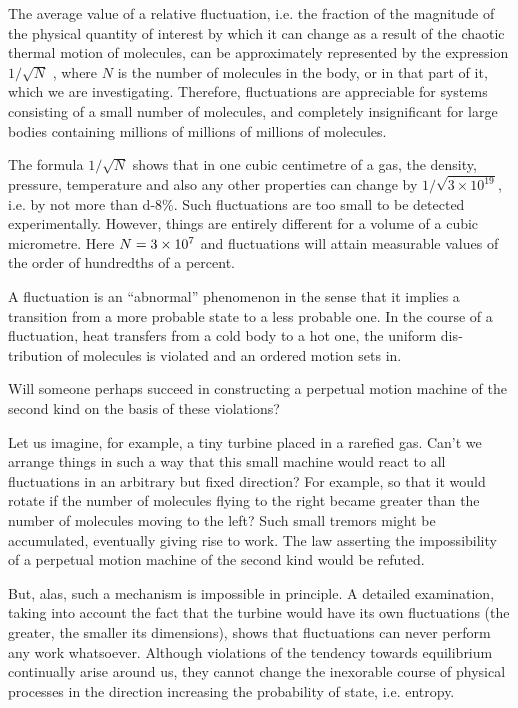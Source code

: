 The average value of a relative fluctuation, i.e. the fraction of the magnitude of the physical quantity of interest by which it can change as a result of the chaotic thermal motion of molecules, can be approximately
represented by the expression $1/\sqrt{N}$ , where $N$ is the number of molecules in the body, or in that part of it, which we are investigating. Therefore, fluctuations are appre­ciable for systems consisting of a small number of mole­cules, and completely insignificant for large bodies containing millions of millions of millions of molecules.

The formula $1/\sqrt{N}$ shows that in one cubic centimetre of a gas, the density, pressure, temperature and also any other properties can change by $1/\sqrt{3 \times 10^{19}}$, i.e. by not more than \num{d-8}\%. Such fluctuations are too small to be detected experimentally. However, things are entirely different for a volume of a cubic micrometre. Here $N = \num{3d7}$ and fluctuations will attain measurable val­ues of the order of hundredths of a percent.

A fluctuation is an ``abnormal'' phenomenon in the sense that it implies a transition from a more probable state to a less probable one. In the course of a fluctuation, heat transfers from a cold body to a hot one, the uniform dis­tribution of molecules is violated and an ordered motion sets in.

Will someone perhaps succeed in constructing a perpet­ual motion machine of the second kind on the basis of these violations?

Let us imagine, for example, a tiny turbine placed in a rarefied gas. Can’t we arrange things in such a way that this small machine would react to all fluctuations in an arbitrary but fixed direction? For example, so that it would rotate if the number of molecules flying to the right became greater than the number of molecules moving to the left? Such small tremors might be accumulated, eventually giving rise to work. The law asserting the impossibility of a perpetual motion machine of the second kind would be refuted.

But, alas, such a mechanism is impossible in princi­ple. A detailed examination, taking into account the fact that the turbine would have its own fluctuations (the greater, the smaller its dimensions), shows that fluctua­tions can never perform any work whatsoever. Although violations of the tendency towards equilibrium continual­ly arise around us, they cannot change the inexorable course of physical processes in the direction increasing the probability of state, i.e. entropy.

